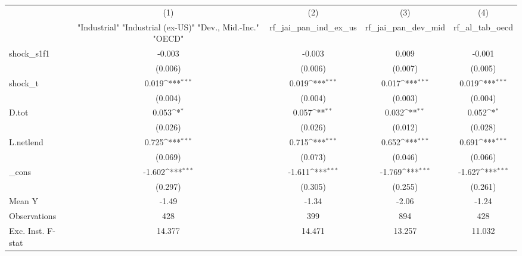 {
\def\sym#1{\ifmmode^{#1}\else\(^{#1}\)\fi}
\begin{tabular}{l*{4}{c}}
\toprule
            &\multicolumn{1}{c}{(1)}&\multicolumn{1}{c}{(2)}&\multicolumn{1}{c}{(3)}&\multicolumn{1}{c}{(4)}\\
            &\multicolumn{1}{c}{ "Industrial" "Industrial (ex-US)" "Dev., Mid.-Inc." "OECD" }&\multicolumn{1}{c}{rf\_jai\_pan\_ind\_ex\_us}&\multicolumn{1}{c}{rf\_jai\_pan\_dev\_mid}&\multicolumn{1}{c}{rf\_al\_tab\_oecd}\\
\midrule
shock\_s1f1  &      -0.003         &      -0.003         &       0.009         &      -0.001         \\
            &     (0.006)         &     (0.006)         &     (0.007)         &     (0.005)         \\
\addlinespace
shock\_t     &       0.019\sym{***}&       0.019\sym{***}&       0.017\sym{***}&       0.019\sym{***}\\
            &     (0.004)         &     (0.004)         &     (0.003)         &     (0.004)         \\
\addlinespace
D.tot       &       0.053\sym{*}  &       0.057\sym{**} &       0.032\sym{**} &       0.052\sym{*}  \\
            &     (0.026)         &     (0.026)         &     (0.012)         &     (0.028)         \\
\addlinespace
L.netlend   &       0.725\sym{***}&       0.715\sym{***}&       0.652\sym{***}&       0.691\sym{***}\\
            &     (0.069)         &     (0.073)         &     (0.046)         &     (0.066)         \\
\addlinespace
\_cons      &      -1.602\sym{***}&      -1.611\sym{***}&      -1.769\sym{***}&      -1.627\sym{***}\\
            &     (0.297)         &     (0.305)         &     (0.255)         &     (0.261)         \\
\midrule
Mean Y      &       -1.49         &       -1.34         &       -2.06         &       -1.24         \\
Observations&         428         &         399         &         894         &         428         \\
Exc. Inst. F-stat&      14.377         &      14.471         &      13.257         &      11.032         \\
\bottomrule
\end{tabular}
}
